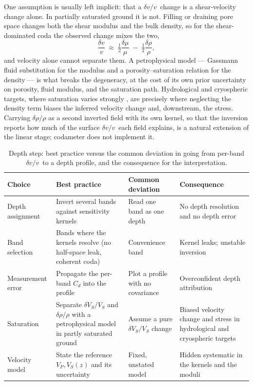 \documentclass[
  referee]{gji}
\providecommand{\dvv}{\ensuremath{\delta v/v}}
\begin{document}
One assumption is usually left implicit: that a \dvv~change is a
shear-velocity change alone. In partially saturated ground it is not.
Filling or draining pore space changes both the shear modulus and the
bulk density, so for the shear-dominated coda the observed change mixes
the two, \begin{equation}
\frac{\delta v}{v} \;\approx\; \tfrac12\frac{\delta\mu}{\mu} \;-\; \tfrac12\frac{\delta\rho}{\rho},
\label{eq:density}
\end{equation} and velocity alone cannot separate them. A petrophysical
model --- Gassmann fluid substitution for the modulus and a
porosity--saturation relation for the density
\citep{Gassmann1951, Mavko2009} --- is what breaks the degeneracy, at
the cost of its own prior uncertainty on porosity, fluid modulus, and
the saturation path. Hydrological and cryospheric targets, where
saturation varies strongly \citep{Clements2018, James2019}, are
precisely where neglecting the density term biases the inferred velocity
change and, downstream, the stress. Carrying \(\delta\rho/\rho\) as a
second inverted field with its own kernel, so that the inversion reports
how much of the surface \dvv~each field explains, is a natural extension
of the linear stage; codameter does not implement it.

\begin{table}
\footnotesize
\caption{Depth step: best practice versus the common deviation in going from
per-band \dvv\ to a depth profile, and the consequence for the interpretation.}
\label{tab:bp-depth}
\begin{tabularx}{\textwidth}{@{}>{\raggedright\arraybackslash}p{2.6cm} L L L@{}}
\toprule
\textbf{Choice} & \textbf{Best practice} & \textbf{Common deviation} &
\textbf{Consequence} \\
\midrule
Depth assignment & Invert several bands against sensitivity kernels &
Read one band as one depth & No depth resolution and no depth error \\ \hline
Band selection & Bands where the kernels resolve (no half-space leak, coherent
coda) & Convenience band & Kernel leaks; unstable inversion \\ \hline
Measurement error & Propagate the per-band $C_d$ into the profile & Plot a profile
with no covariance & Overconfident depth attribution \\ \hline
Saturation & Separate $\delta V_S/V_S$ and $\delta\rho/\rho$ with a petrophysical
model in partly saturated ground & Assume a pure $\delta V_S/V_S$ change & Biased
velocity change and stress in hydrological and cryospheric targets \\ \hline
Velocity model & State the reference $V_P,V_S(z)$ and its uncertainty & Fixed,
unstated model & Hidden systematic in the kernels and the moduli \\
\bottomrule
\end{tabularx}
\end{table}
\end{document}
